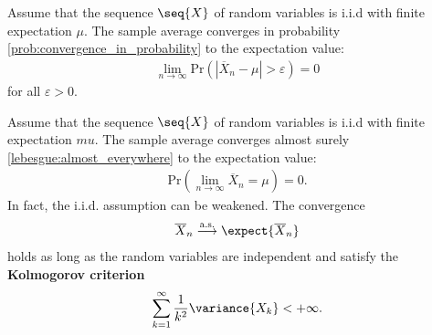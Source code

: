     \begin{theorem}
        Assume that the sequence $\seq{X}$ of random variables is i.i.d with finite expectation $\mu$. The sample average converges in probability \ref{prob:convergence_in_probability} to the expectation value:
        \begin{gather}
            \lim_{n\rightarrow\infty}\mathrm{Pr}\left(|\overline{X}_n-\mu|>\varepsilon\right)=0
        \end{gather}
        for all $\varepsilon>0$.
    \end{theorem}
    \begin{theorem}\label{prob:strong_lln}
        Assume that the sequence $\seq{X}$ of random variables is i.i.d with finite expectation $mu$. The sample average converges almost surely \ref{lebesgue:almost_everywhere} to the expectation value:
        \begin{gather}
            \mathrm{Pr}\left(\lim_{n\rightarrow\infty}\overline{X}_n=\mu\right)=0.
        \end{gather}
        In fact, the i.i.d. assumption can be weakened. The convergence
        \begin{gather}
            \overline{X}_n\overset{\text{a.s.}}{\longrightarrow}\expect{\overline{X}_n}
        \end{gather}
        holds as long as the random variables are independent and satisfy the \textbf{Kolmogorov criterion}
        \begin{gather}
            \sum_{k=1}^\infty\frac{1}{k^2}\variance{X_k}<+\infty.
        \end{gather}
    \end{theorem}


